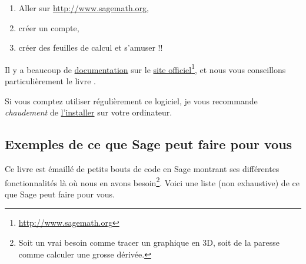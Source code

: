 \begin{enumerate}
	\item
	      Aller sur \url{http://www.sagemath.org},
	\item
	      créer un compte,
	\item
	      créer des feuilles de calcul et s'amuser !!
\end{enumerate}

Il y a beaucoup de \href{http://lmgtfy.com/?q=sage+documentation}{documentation} sur le \href{http://www.sagemath.org}{site officiel}\footnote{\href{http://www.sagemath.org}{http://www.sagemath.org}}, et nous vous conseillons particulièrement le livre \cite{ooBLMMooWTPsQy}.

Si vous comptez utiliser régulièrement ce logiciel, je vous recommande \emph{chaudement} de \href{http://mirror.switch.ch/mirror/sagemath/index.html}{l'installer} sur votre ordinateur.

\subsection{Exemples de ce que Sage peut faire pour vous}

Ce livre est émaillé de petits bouts de code en Sage montrant ses différentes fonctionnalités là où nous en avons besoin\footnote{Soit un vrai besoin comme tracer un graphique en 3D, soit de la paresse comme calculer une grosse dérivée.}. Voici une liste (non exhaustive) de ce que Sage peut faire pour vous.

